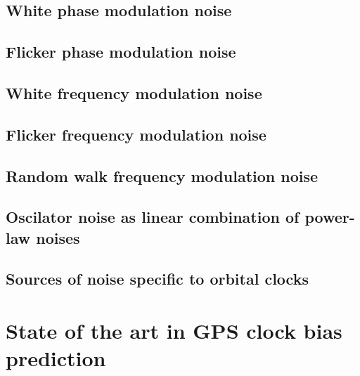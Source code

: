 \subsection{White phase modulation noise}

\subsection{Flicker phase modulation noise}

\subsection{White frequency modulation noise}

\subsection{Flicker frequency modulation noise}

\subsection{Random walk frequency modulation noise}

\subsection{Oscilator noise as linear combination of power-law noises}

\subsection{Sources of noise specific to orbital clocks}


\section{State of the art in GPS clock bias prediction}

